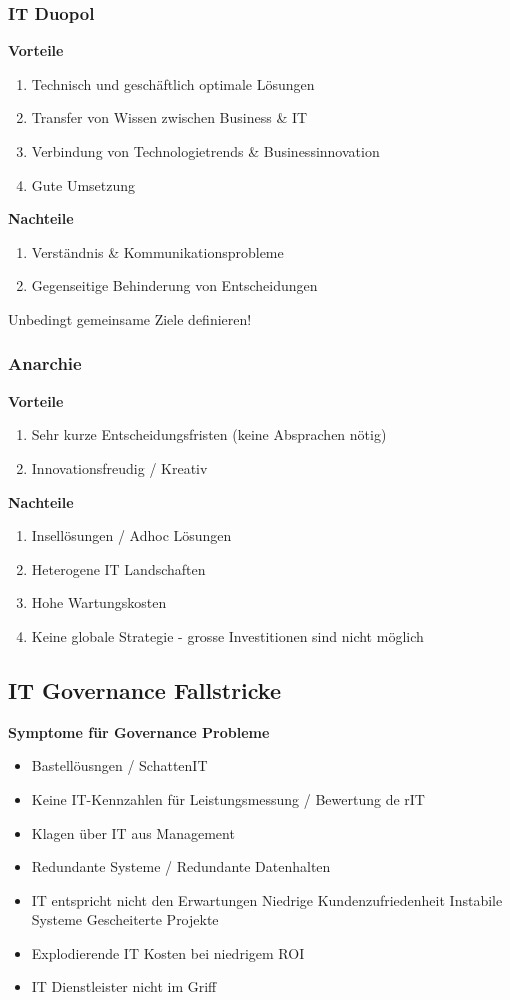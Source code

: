 \subsubsection{IT Duopol}
\textbf{Vorteile}
\begin{enumerate}
	\item Technisch und geschäftlich optimale Lösungen
	\item Transfer von Wissen zwischen Business \& IT
	\item Verbindung von Technologietrends \& Businessinnovation
	\item Gute Umsetzung
\end{enumerate}
\textbf{Nachteile}
\begin{enumerate}
	\item Verständnis \& Kommunikationsprobleme
	\item Gegenseitige Behinderung von Entscheidungen
\end{enumerate}
Unbedingt gemeinsame Ziele definieren!
\subsubsection{Anarchie}
\textbf{Vorteile}
\begin{enumerate}
	\item Sehr kurze Entscheidungsfristen (keine Absprachen nötig)
	\item Innovationsfreudig / Kreativ
\end{enumerate}
\textbf{Nachteile}
\begin{enumerate}
	\item Insellösungen / Adhoc Lösungen
	\item Heterogene IT Landschaften
	\item Hohe Wartungskosten
	\item Keine globale Strategie - grosse Investitionen sind nicht möglich
\end{enumerate}

\subsection{IT Governance Fallstricke}
\textbf{Symptome für Governance Probleme}
\begin{itemize}
	\item Bastellöusngen / SchattenIT
	\item Keine IT-Kennzahlen für Leistungsmessung / Bewertung de rIT
	\item Klagen über IT aus Management
	\item Redundante Systeme / Redundante Datenhalten
	\item IT entspricht nicht den Erwartungen
		\subitem Niedrige Kundenzufriedenheit
		\subitem Instabile Systeme
		\subitem Gescheiterte Projekte
	\item Explodierende IT Kosten bei niedrigem ROI
	\item IT Dienstleister nicht im Griff
\end{itemize}

